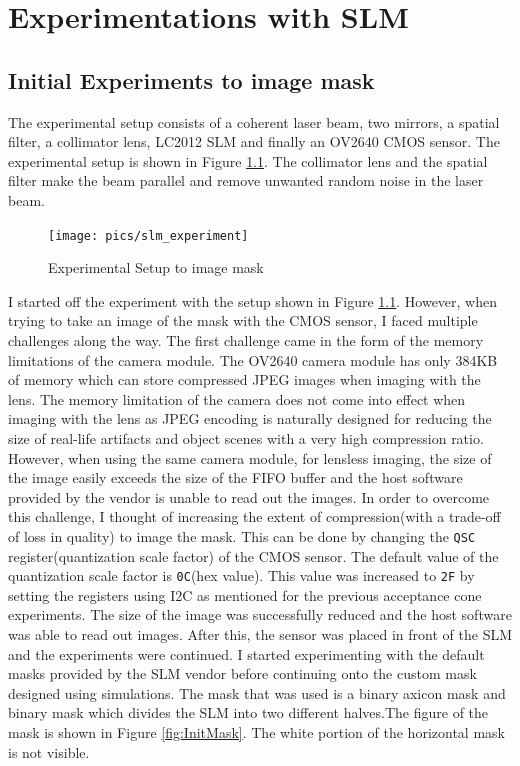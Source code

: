 \chapter{Experimentations with SLM}
\label{chp:SLM}
\section{Initial Experiments to image mask}
The experimental setup consists of a coherent laser beam, two mirrors, a spatial filter, a collimator lens, LC2012 SLM and finally an OV2640 CMOS sensor. The experimental setup is shown in Figure \ref{fig:experiment_slm}. The collimator lens and the spatial filter make the beam parallel and remove unwanted random noise in the laser beam.


\begin{figure}[htbp]
\centering
\texttt{[image: pics/slm\_experiment]}
\caption{Experimental Setup to image mask}
\label{fig:experiment_slm}
\end{figure}



I started off the experiment with the setup shown in Figure \ref{fig:experiment_slm}. However, when trying to take an image of the mask with the CMOS sensor, I faced multiple challenges along the way. The first challenge came in the form of the memory limitations of the camera module. The OV2640 camera module has only 384KB of memory which can store compressed JPEG images when imaging with the lens. The memory limitation of the camera does not come into effect when imaging with the lens as JPEG encoding is naturally designed for reducing the size of real-life artifacts and object scenes with a very high compression ratio. However, when using the same camera module, for lensless imaging, the size of the image easily exceeds the size of the FIFO buffer and the host software provided by the vendor is unable to read out the images. In order to overcome this challenge, I thought of increasing the extent of compression(with a trade-off of loss in quality) to image the mask. This can be done by changing the \texttt{QSC} register(quantization scale factor) \cite{OV2640DS} of the CMOS sensor. The default value of the quantization scale factor is \texttt{0C}(hex value). This value was increased to \texttt{2F} by setting the registers using I2C as mentioned for the previous acceptance cone experiments. The size of the image was successfully reduced and the host software was able to read out images. After this, the sensor was placed in front of the SLM and the experiments were continued. I started experimenting with the default masks provided by the SLM vendor before continuing onto the custom mask designed using simulations. The mask that was used is a binary axicon mask and binary mask which divides the SLM into two different halves.The figure of the mask is shown in Figure \ref{fig:InitMask}. The white portion of the horizontal mask is not visible.

